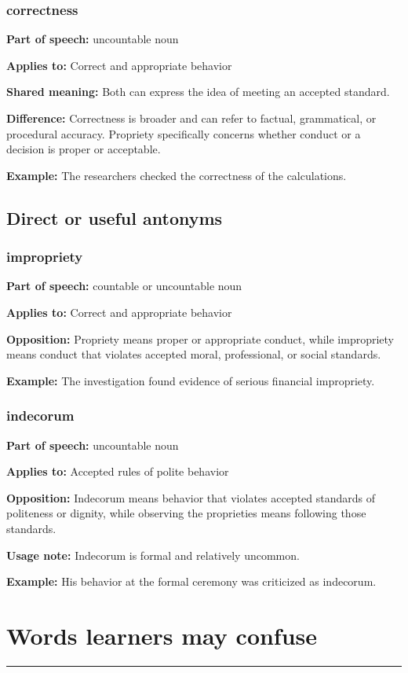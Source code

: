 \documentclass[11pt]{article}
\newcommand{\sectionrule}{\par\vspace{-0.5em}\noindent\textcolor{Accent}{\rule{\linewidth}{0.6pt}}\par}
\begin{document}
\subsubsection{correctness}
\textbf{Part of speech:} uncountable noun

\textbf{Applies to:} Correct and appropriate behavior

\textbf{Shared meaning:} Both can express the idea of meeting an accepted standard.

\textbf{Difference:} Correctness is broader and can refer to factual, grammatical, or procedural accuracy. Propriety specifically concerns whether conduct or a decision is proper or acceptable.

\textbf{Example:} The researchers checked the correctness of the calculations.

\subsection{Direct or useful antonyms}
\subsubsection{impropriety}
\textbf{Part of speech:} countable or uncountable noun

\textbf{Applies to:} Correct and appropriate behavior

\textbf{Opposition:} Propriety means proper or appropriate conduct, while impropriety means conduct that violates accepted moral, professional, or social standards.

\textbf{Example:} The investigation found evidence of serious financial impropriety.

\subsubsection{indecorum}
\textbf{Part of speech:} uncountable noun

\textbf{Applies to:} Accepted rules of polite behavior

\textbf{Opposition:} Indecorum means behavior that violates accepted standards of politeness or dignity, while observing the proprieties means following those standards.

\textbf{Usage note:} Indecorum is formal and relatively uncommon.

\textbf{Example:} His behavior at the formal ceremony was criticized as indecorum.

\section{Words learners may confuse}
\sectionrule
\end{document}
